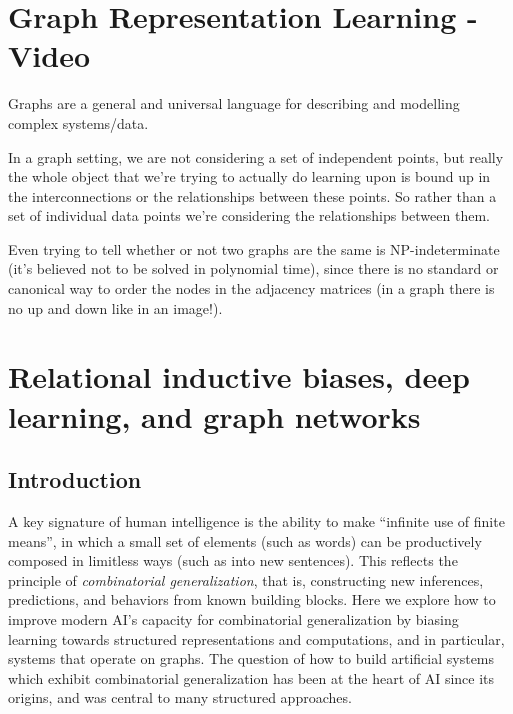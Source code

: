 \documentclass[10pt, onecolumn]{article}
\let\defaultmarginpar\marginpar
\renewcommand\marginpar[2][]{\defaultmarginpar{\itshape\color{gray}#2}}
\begin{document}
\newpage


\section{Graph Representation Learning - Video}

Graphs are a general and universal language for describing and modelling complex systems/data.

In a graph setting, we are not considering a set of independent points, but really the whole object that we're trying to actually do learning upon is bound up in the interconnections or the relationships between these points. So rather than a set of individual data points we're considering the relationships between them.

Even trying to tell whether or not two graphs are the same is NP-indeterminate (it's believed not to be solved in polynomial time), since there is no standard or canonical way to order the nodes in the adjacency matrices (in a graph there is no up and down like in an image!).



\newpage

\section{Relational inductive biases, deep learning, and graph networks}

\subsection{Introduction}

A key signature of human intelligence is the ability to make ``infinite use of finite means'', in which a small set of elements (such as words) can be productively composed in limitless ways (such as into new sentences). This reflects the principle of \emph{combinatorial generalization}\marginpar{combinatorial generalization}, that is, constructing new inferences, predictions, and behaviors from known building blocks. Here we explore how to improve modern AI's capacity for combinatorial generalization by biasing learning towards structured representations and computations, and in particular, systems that operate on graphs. The question of how to build artificial systems which exhibit combinatorial generalization has been at the heart of AI since its origins, and was central to many structured approaches.
\end{document}
